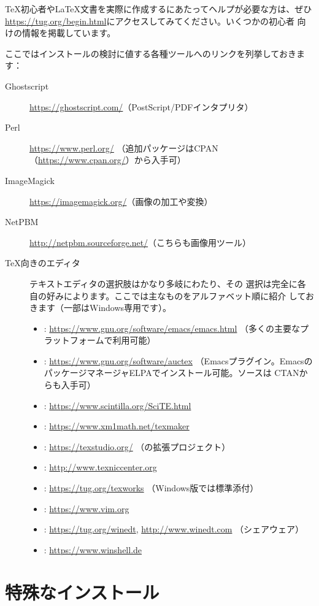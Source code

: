 \documentclass[uplatex,dvipdfmx]{jsarticle}
\begin{document}
\TeX 初心者や\LaTeX 文書を実際に作成するにあたってヘルプが必要な方は、ぜひ
\url{https://tug.org/begin.html}にアクセスしてみてください。いくつかの初心者
向けの情報を掲載しています。

ここではインストールの検討に値する各種ツールへのリンクを列挙しておきます：
%
\begin{description}
\item[Ghostscript] \url{https://ghostscript.com/}（PostScript/PDFインタプリタ）
\item[Perl] \url{https://www.perl.org/}%
  （追加パッケージはCPAN（\url{https://www.cpan.org/}）から入手可）
\item[ImageMagick] \url{https://imagemagick.org/}（画像の加工や変換）
\item[NetPBM] \url{http://netpbm.sourceforge.net/}（こちらも画像用ツール）
\item[\TeX 向きのエディタ] テキストエディタの選択肢はかなり多岐にわたり、その
  選択は完全に各自の好みによります。ここでは主なものをアルファベット順に紹介
  しておきます（一部はWindows専用です）。
  \begin{itemize}
  \item {}: \url{https://www.gnu.org/software/emacs/emacs.html}%
    （多くの主要なプラットフォームで利用可能）
  \item {}: \url{https://www.gnu.org/software/auctex}%
    （Emacsプラグイン。EmacsのパッケージマネージャELPAでインストール可能。ソースは
    CTANからも入手可）
  \item {}: \url{https://www.scintilla.org/SciTE.html}
  \item {}: \url{https://www.xm1math.net/texmaker}
  \item {}: \url{https://texstudio.org/}%
    （の拡張プロジェクト）
  \item {}: \url{http://www.texniccenter.org}
  \item {}: \url{https://tug.org/texworks}%
    （Windows版\TL では標準添付）
  \item {}: \url{https://www.vim.org}
  \item {}: \url{https://tug.org/winedt}, \url{http://www.winedt.com}%
    （シェアウェア）
  \item {}: \url{https://www.winshell.de}
  \end{itemize}
\end{description}

\section{特殊なインストール}
\end{document}
